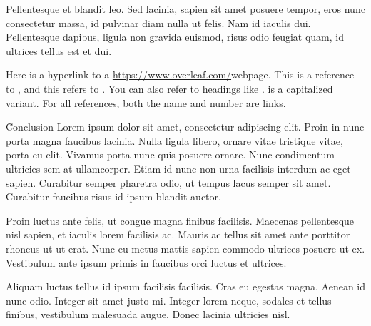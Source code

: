 \documentclass{textbook}
\begin{document}
Pellentesque et blandit leo. Sed lacinia, sapien sit amet posuere tempor, eros nunc consectetur massa, id pulvinar diam nulla ut felis. Nam id iaculis dui. Pellentesque dapibus, ligula non gravida euismod, risus odio feugiat quam, id ultrices tellus est et dui.

Here is a hyperlink to a \url{https://www.overleaf.com/}{webpage}. This is a reference to , and this refers to . You can also refer to headings like .  is a capitalized variant. For all references, both the name and number are links.

\h{Conclusion}
Lorem ipsum dolor sit amet, consectetur adipiscing elit. Proin in nunc porta magna faucibus lacinia. Nulla ligula libero, ornare vitae tristique vitae, porta eu elit. Vivamus porta nunc quis posuere ornare. Nunc condimentum ultricies sem at ullamcorper. Etiam id nunc non urna facilisis interdum ac eget sapien. Curabitur semper pharetra odio, ut tempus lacus semper sit amet. Curabitur faucibus risus id ipsum blandit auctor.

Proin luctus ante felis, ut congue magna finibus facilisis. Maecenas pellentesque nisl sapien, et iaculis lorem facilisis ac. Mauris ac tellus sit amet ante porttitor rhoncus ut ut erat. Nunc eu metus mattis sapien commodo ultrices posuere ut ex. Vestibulum ante ipsum primis in faucibus orci luctus et ultrices.

Aliquam luctus tellus id ipsum facilisis facilisis. Cras eu egestas magna. Aenean id nunc odio. Integer sit amet justo mi. Integer lorem neque, sodales et tellus finibus, vestibulum malesuada augue. Donec lacinia ultricies nisl.
\end{document}
